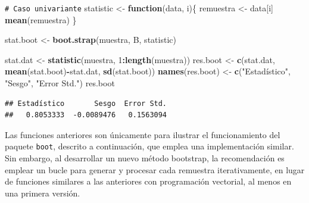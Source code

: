 \documentclass[
]{book}
\newenvironment{Shaded}{\begin{snugshade}}{\end{snugshade}}
\newcommand{\AttributeTok}[1]{\textcolor[rgb]{0.13,0.29,0.53}{#1}}
\newcommand{\CommentTok}[1]{\textcolor[rgb]{0.56,0.35,0.01}{\textit{#1}}}
\newcommand{\ControlFlowTok}[1]{\textcolor[rgb]{0.13,0.29,0.53}{\textbf{#1}}}
\newcommand{\DecValTok}[1]{\textcolor[rgb]{0.00,0.00,0.81}{#1}}
\newcommand{\FunctionTok}[1]{\textcolor[rgb]{0.13,0.29,0.53}{\textbf{#1}}}
\newcommand{\NormalTok}[1]{#1}
\newcommand{\OtherTok}[1]{\textcolor[rgb]{0.56,0.35,0.01}{#1}}
\newcommand{\SpecialCharTok}[1]{\textcolor[rgb]{0.81,0.36,0.00}{\textbf{#1}}}
\newcommand{\StringTok}[1]{\textcolor[rgb]{0.31,0.60,0.02}{#1}}
\theoremstyle{break}
\theoremstyle{nonumberplain}
\renewcommand{\CommentTok}[1]{\textcolor[rgb]{0.41,0.41,0.41}{\texttt{#1}}}
\begin{document}
\begin{Shaded}
\begin{Highlighting}[]
\CommentTok{\# Caso univariante}
\NormalTok{statistic }\OtherTok{\textless{}{-}} \ControlFlowTok{function}\NormalTok{(data, i)\{}
\NormalTok{  remuestra }\OtherTok{\textless{}{-}}\NormalTok{ data[i]}
  \FunctionTok{mean}\NormalTok{(remuestra)}
\NormalTok{\}}

\NormalTok{stat.boot }\OtherTok{\textless{}{-}} \FunctionTok{boot.strap}\NormalTok{(muestra, B, statistic)}

\NormalTok{stat.dat }\OtherTok{\textless{}{-}} \FunctionTok{statistic}\NormalTok{(muestra, }\DecValTok{1}\SpecialCharTok{:}\FunctionTok{length}\NormalTok{(muestra))}
\NormalTok{res.boot }\OtherTok{\textless{}{-}} \FunctionTok{c}\NormalTok{(stat.dat, }\FunctionTok{mean}\NormalTok{(stat.boot)}\SpecialCharTok{{-}}\NormalTok{stat.dat, }\FunctionTok{sd}\NormalTok{(stat.boot))}
\FunctionTok{names}\NormalTok{(res.boot) }\OtherTok{\textless{}{-}} \FunctionTok{c}\NormalTok{(}\StringTok{"Estadístico"}\NormalTok{, }\StringTok{"Sesgo"}\NormalTok{, }\StringTok{"Error Std."}\NormalTok{)}
\NormalTok{res.boot}
\end{Highlighting}
\end{Shaded}

\begin{verbatim}
## Estadístico       Sesgo  Error Std. 
##   0.8053333  -0.0089476   0.1563094
\end{verbatim}

\begin{Shaded}
\end{Shaded}

Las funciones anteriores son únicamente para ilustrar el funcionamiento del paquete \texttt{boot}, descrito a continuación, que emplea una implementación similar.
Sin embargo, al desarrollar un nuevo método bootstrap, la recomendación es emplear un bucle para generar y procesar cada remuestra iterativamente, en lugar de funciones similares a las anteriores con programación vectorial, al menos en una primera versión.
\end{document}
